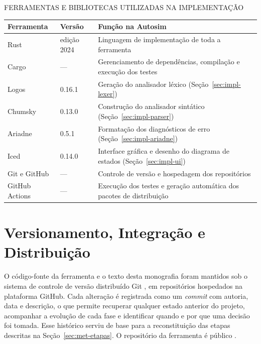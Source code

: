 \documentclass[
    12pt
    ,oneside
    ,a4paper
    ,chapter=TITLE
    ,section=TITLE
    ,sumario=abnt-6027-2012]{abntex2}
\begin{document}
\begin{quadro}[h]
    \centering
    \caption{FERRAMENTAS E BIBLIOTECAS UTILIZADAS NA IMPLEMENTAÇÃO}
    \label{quad:ferramentas}
    \small
    \begin{tabularx}{\textwidth}{|l|l|Z|}
        \hline
        \textbf{Ferramenta} & \textbf{Versão} & \textbf{Função na Autosim} \\
        \hline
        Rust              & edição 2024 & Linguagem de implementação de toda a ferramenta \\
        \hline
        Cargo             & ---         & Gerenciamento de dependências, compilação e execução dos testes \\
        \hline
        Logos             & 0.16.1      & Geração do analisador léxico (Seção~\ref{sec:impl-lexer}) \\
        \hline
        Chumsky           & 0.13.0      & Construção do analisador sintático (Seção~\ref{sec:impl-parser}) \\
        \hline
        Ariadne           & 0.5.1       & Formatação dos diagnósticos de erro (Seção~\ref{sec:impl-ariadne}) \\
        \hline
        Iced              & 0.14.0      & Interface gráfica e desenho do diagrama de estados (Seção~\ref{sec:impl-ui}) \\
        \hline
        Git e GitHub      & ---         & Controle de versão e hospedagem dos repositórios \\
        \hline
        GitHub Actions    & ---         & Execução dos testes e geração automática dos pacotes de distribuição \\
        \hline
    \end{tabularx}
\end{quadro}

\section{Versionamento, Integração e Distribuição}
\label{sec:ferr-versionamento}

O código-fonte da ferramenta e o texto desta monografia foram mantidos sob o sistema de
controle de versão distribuído Git \cite{chacon2014}, em repositórios hospedados na plataforma
GitHub. Cada alteração é registrada como um \textit{commit} com autoria, data e descrição, o
que permite recuperar qualquer estado anterior do projeto, acompanhar a evolução de cada fase
e identificar quando e por que uma decisão foi tomada. Esse histórico serviu de base para a
reconstituição das etapas descritas na Seção~\ref{sec:met-etapas}. O repositório da ferramenta
é público \cite{autosim2026}.
\end{document}

